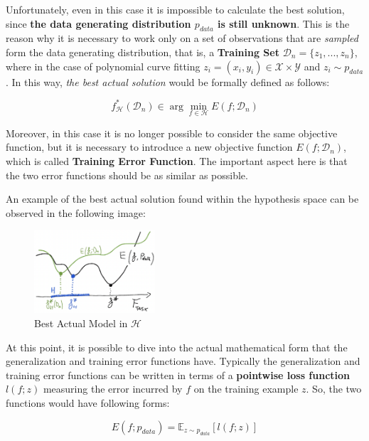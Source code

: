 Unfortunately, even in this case it is impossible to calculate the best solution,
since \textbf{the data generating distribution $p_{data}$ is still unknown}. This
is the reason why it is necessary to work only on a set of observations that are
\emph{sampled} form the data generating distribution, that is, a \textbf{Training Set}
$\mathcal{D}_n = \{z_1,...,z_n\}$, where in the case of polynomial curve fitting
$z_i = (x_i,y_i) \in \mathcal{X} \times \mathcal{Y}$ and $z_i \sim p_{data}$.
In this way, \emph{the best actual solution} would be formally defined as follows:

\newpage

\begin{equation*}
      f_{\mathcal{H}}^*(\mathcal{D}_n) \in \arg \min_{f \in \mathcal{H}} E(f; \mathcal{D}_n)
\end{equation*}

Moreover, in this case it is no longer possible to consider the same objective
function, but it is necessary to introduce a new objective function $E(f; \mathcal{D}_n)$,
which is called \textbf{Training Error Function}. The important aspect here is that
the two error functions should be as similar as possible.

An example of the best actual solution found within the hypothesis space can be observed
in the following image:

\begin{figure}[h]
      \centering
      \includegraphics[width=0.4\textwidth]{../img/Best_actual_model}
      \caption{Best Actual Model in $\mathcal{H}$}
\end{figure}

At this point, it is possible to dive into the actual mathematical form that the
generalization and training error functions have. Typically the generalization and
training error functions can be written in terms of a \textbf{pointwise loss function}
$l(f;z)$ measuring the error incurred by $f$ on the training example $z$. So, the two
functions would have following forms:

\begin{equation*}
      E(f; p_{data}) = \mathbb{E}_{z \sim p_{data}}[l(f;z)]
\end{equation*}

